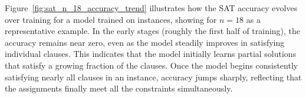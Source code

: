 Figure~\ref{fig:sat_n_18_accuracy_trend} illustrates how the SAT accuracy evolves over training for a model trained on instances, showing for $n=18$ as a representative example. In the early stages (roughly the first half of training), the accuracy remains near zero, even as the model steadily improves in satisfying individual clauses. This indicates that the model initially learns partial solutions that satisfy a growing fraction of the clauses. Once the model begins consistently satisfying nearly all clauses in an instance, accuracy jumps sharply, reflecting that the assignments finally meet all the constraints simultaneously.
